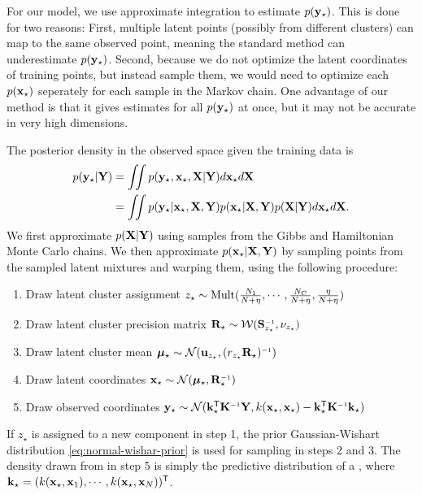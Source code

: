 For our model, we use approximate integration to estimate $p({\bf{y}}_\star)$.
This is done for two reasons:
First, multiple latent points (possibly from different clusters) can map to the same observed point, meaning the standard method can underestimate $p({\bf{y}}_\star)$.
Second, because we do not optimize the latent coordinates of training points, but instead sample them, we would need to optimize each $p({\bf{x}}_\star)$ seperately for each sample in the Markov chain.
One advantage of our method is that it gives estimates for all $p({\bf{y}}_\star)$ at once, but it may not be accurate in very high dimensions.

The posterior density in the observed space given the training data is
\begin{align}
p({\bf{y}}_\star | \mathbf{Y})
& = \int \!\!\! \int p({\bf{y}}_\star,{\bf{x}}_\star, \mathbf{X} | \mathbf{Y})d{\bf{x}}_\star d\mathbf{X} \nonumber\\
& = \int\!\!\! \int p({\bf{y}}_\star | {\bf{x}}_\star, \mathbf{X}, \mathbf{Y})p({\bf{x}}_\star|\mathbf{X},\mathbf{Y})p(\mathbf{X}|\mathbf{Y})d{\bf{x}}_\star d\mathbf{X}.
\label{eq:density}
\end{align}
We first approximate $p(\mathbf{X} | \mathbf{Y})$ using samples from the Gibbs and Hamiltonian Monte Carlo chains.
We then approximate $p({\bf{x}}_\star | \mathbf{X}, \mathbf{Y})$ by sampling points from the sampled latent mixtures and warping them, using the following procedure:
\begin{enumerate}
\item Draw latent cluster assignment $z_\star \sim {\rm Mult}(\frac{N_{1}}{N+\eta},\cdots,\frac{N_{C}}{N+\eta},\frac{\eta}{N+\eta})$
\item Draw latent cluster precision matrix $\vR_\star \sim {\cal W}(\vS\inv_{z_\star},\nu_{z_\star})$
\item Draw latent cluster mean $\vmu_\star \sim {\cal N}(\vu_{z_\star},(r_{z_\star}\vR_\star)\inv)$
\item Draw latent coordinates $\vx_\star \sim {\cal N}(\vmu_\star,\vR_\star\inv)$
\item Draw observed coordinates $\vy_\star \sim 
{\cal N}(\vk_\star\tra \vK\inv \vY, k(\vx_\star,\vx_\star) - \vk_\star\tra \vK\inv \vk_\star)$
\end{enumerate}
%
If $z_\star$ is assigned to a new component in step 1, the prior Gaussian-Wishart distribution \eqref{eq:normal-wishar-prior} is used for sampling in steps 2 and 3.
The density drawn from in step 5 is simply the predictive distribution of a \gp{}, where
%
${\bf{k}}_\star=( k({\bf{x}}_\star, {\bf{x}}_1), \cdots, k({\bf{x}}_\star, {\bf{x}}_N))^{\mathsf{T}}$.

